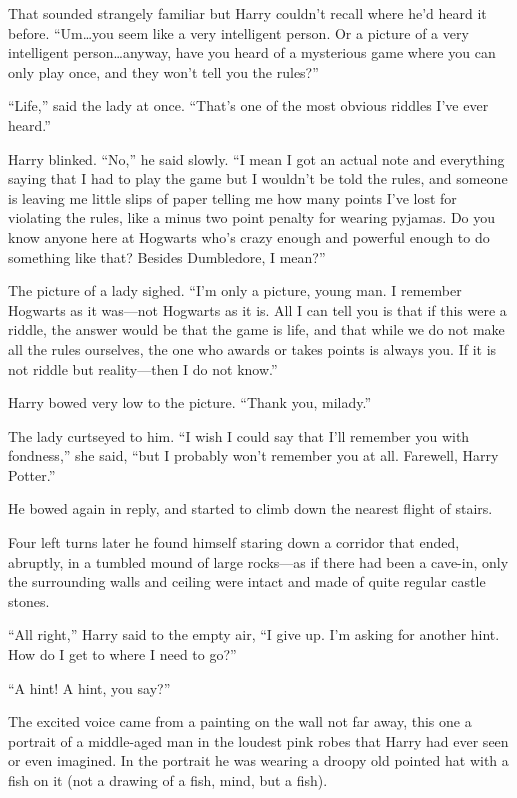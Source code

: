 That sounded strangely familiar but Harry couldn’t recall where he’d heard it before. “Um…you seem like a very intelligent person. Or a picture of a very intelligent person…anyway, have you heard of a mysterious game where you can only play once, and they won’t tell you the rules?”

“Life,” said the lady at once. “That’s one of the most obvious riddles I’ve ever heard.”

Harry blinked. “No,” he said slowly. “I mean I got an actual note and everything saying that I had to play the game but I wouldn’t be told the rules, and someone is leaving me little slips of paper telling me how many points I’ve lost for violating the rules, like a minus two point penalty for wearing pyjamas. Do you know anyone here at Hogwarts who’s crazy enough and powerful enough to do something like that? Besides Dumbledore, I mean?”

The picture of a lady sighed. “I’m only a picture, young man. I remember Hogwarts as it was—not Hogwarts as it is. All I can tell you is that if this were a riddle, the answer would be that the game is life, and that while we do not make all the rules ourselves, the one who awards or takes points is always you. If it is not riddle but reality—then I do not know.”

Harry bowed very low to the picture. “Thank you, milady.”

The lady curtseyed to him. “I wish I could say that I’ll remember you with fondness,” she said, “but I probably won’t remember you at all. Farewell, Harry Potter.”

He bowed again in reply, and started to climb down the nearest flight of stairs.

Four left turns later he found himself staring down a corridor that ended, abruptly, in a tumbled mound of large rocks—as if there had been a cave-in, only the surrounding walls and ceiling were intact and made of quite regular castle stones.

“All right,” Harry said to the empty air, “I give up. I’m asking for another hint. How do I get to where I need to go?”

“A hint! A hint, you say?”

The excited voice came from a painting on the wall not far away, this one a portrait of a middle-aged man in the loudest pink robes that Harry had ever seen or even imagined. In the portrait he was wearing a droopy old pointed hat with a fish on it (not a drawing of a fish, mind, but a fish).

